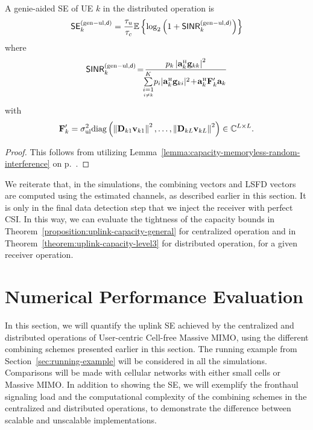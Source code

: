 \begin{corollary} \label{corollary-genie-aided-level3}
A genie-aided SE of UE $k$  in the distributed operation is
	\begin{equation}\label{eq:genie-aided-uplink-SE-level3}
	\begin{split}
	\mathsf{SE}_{k}^{({\rm gen-ul},\mathsf{d})} = \frac{\tau_u}{\tau_c}\mathbb{E}\left\{ \log_2   \left( 1 + \mathsf{SINR}_{k}^{({\rm gen-ul},\mathsf{d})}  \right) \right\}
	\end{split}
	\end{equation}
where
	\begin{equation}  \label{eq:uplink-instant-SINR-genie-aided-level3}
	\mathacr{SINR}_{k}^{({\rm gen-ul},\dist)}\! =\!  \frac{ p_{k} \left| \vect{a}_{k}^{\Htran}  \vect{g}_{kk} \right|^2  }{ \!
		\!\condSum{i=1}{i \neq k}{K} p_{i}  |\vect{a}_{k}^{\Htran}\vect{g}_{ki}|^2    \!+\!  \vect{a}_{k}^{\Htran}\vect{F}_{k}^{\prime}
		\vect{a}_{k} 
	}
	\end{equation}
	with
	$$
	\mathbf{F}_{k}^{\prime}=\sigma^2_{\mathrm{ul}}\mathrm{diag}\left( \left\|  \mathbf{D}_{k1}\mathbf{v}_{k1}  \right\|^2, \ldots,  \left\|  \mathbf{D}_{kL}\mathbf{v}_{kL}  \right\|^2\right) \in \mathbb{C}^{L \times L}.$$
\end{corollary}
\begin{proof}
This follows from utilizing Lemma~\ref{lemma:capacity-memoryless-random-interference} on p.~\pageref{lemma:capacity-memoryless-random-interference}.
\end{proof}

We reiterate that, in the simulations, the combining vectors and LSFD vectors are computed using the estimated channels, as described earlier in this section. It is only in the final data detection step that we inject the receiver with perfect CSI. In this way, we can evaluate the tightness of the capacity bounds in Theorem~\ref{proposition:uplink-capacity-general} for centralized operation and in Theorem~\ref{theorem:uplink-capacity-level3} for distributed operation, for a given receiver operation.


\section{Numerical Performance Evaluation}
\label{sec:uplink-performance-comparison}



In this section, we will quantify the uplink SE achieved by the centralized and distributed operations of User-centric Cell-free Massive MIMO, using the different combining schemes presented earlier in this section. The running example from Section~\ref{sec:running-example} will be considered in all the simulations. Comparisons will be made with cellular networks with either small cells or Massive MIMO. In addition to showing the SE, we will exemplify the fronthaul signaling load and the computational complexity of the combining schemes in the centralized and distributed operations, to demonstrate the difference between scalable and unscalable implementations.

